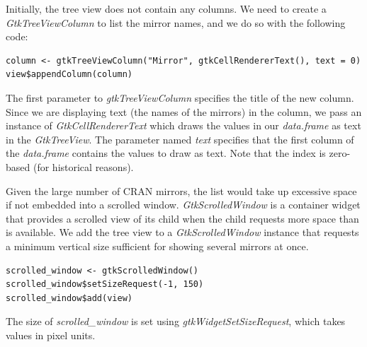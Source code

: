 \documentclass[article]{jss}
\begin{document}
%
%


Initially, the tree view does not contain any columns. We need to
create a \emph{GtkTreeViewColumn} to list the mirror names, and we do so with the following code:
\begin{verbatim}
column <- gtkTreeViewColumn("Mirror", gtkCellRendererText(), text = 0)
view$appendColumn(column)
\end{verbatim}
The first parameter to \emph{gtkTreeViewColumn} specifies the title of the new column. Since we are displaying text (the names of the mirrors) in the column, we pass an instance of \emph{GtkCellRendererText} which draws the values in our \emph{data.frame} as text in the \emph{GtkTreeView}. The parameter named \emph{text} specifies that the first column of the \emph{data.frame} contains the values to draw as text. Note that the index is zero-based (for historical reasons).

Given the large number of CRAN mirrors, the list would take up
excessive space
if not embedded into a scrolled window. \emph{GtkScrolledWindow} is a
container 
widget that provides a scrolled view of its child when the child
requests more
space than is available. We add the tree view to a
\emph{GtkScrolledWindow} 
instance that requests a minimum vertical size sufficient for showing
several 
mirrors at once.
\begin{verbatim}
scrolled_window <- gtkScrolledWindow()
scrolled_window$setSizeRequest(-1, 150)
scrolled_window$add(view)
\end{verbatim}
The size of \emph{scrolled\_window} is set using \emph{gtkWidgetSetSizeRequest}, which takes values in pixel units.
\end{document}
